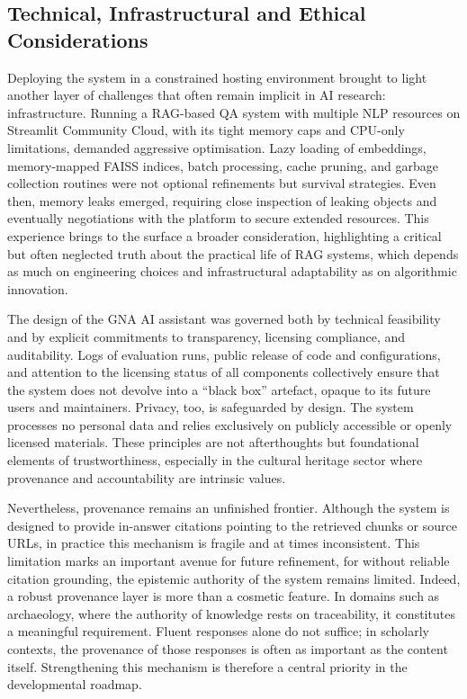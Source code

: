 \begin{spacing}{1.5}
\section{Technical, Infrastructural and Ethical Considerations}
Deploying the system in a constrained hosting environment brought to light another layer of challenges that often remain implicit in AI research: infrastructure. Running a RAG-based QA system with multiple NLP resources on Streamlit Community Cloud, with its tight memory caps and CPU-only limitations, demanded aggressive optimisation. Lazy loading of embeddings, memory-mapped FAISS indices, batch processing, cache pruning, and garbage collection routines were not optional refinements but survival strategies. Even then, memory leaks emerged, requiring close inspection of leaking objects and eventually negotiations with the platform to secure extended resources. This experience brings to the surface a broader consideration, highlighting a critical but often neglected truth about the practical life of RAG systems, which depends as much on engineering choices and infrastructural adaptability as on algorithmic innovation.

The design of the GNA AI assistant was governed both by technical feasibility and by explicit commitments to transparency, licensing compliance, and auditability. Logs of evaluation runs, public release of code and configurations, and attention to the licensing status of all components collectively ensure that the system does not devolve into a ``black box'' artefact, opaque to its future users and maintainers. Privacy, too, is safeguarded by design. The system processes no personal data and relies exclusively on publicly accessible or openly licensed materials. These principles are not afterthoughts but foundational elements of trustworthiness, especially in the cultural heritage sector where provenance and accountability are intrinsic values.

Nevertheless, provenance remains an unfinished frontier. Although the system is designed to provide in-answer citations pointing to the retrieved chunks or source URLs, in practice this mechanism is fragile and at times inconsistent. This limitation marks an important avenue for future refinement, for without reliable citation grounding, the epistemic authority of the system remains limited. Indeed, a robust provenance layer is more than a cosmetic feature. In domains such as archaeology, where the authority of knowledge rests on traceability, it constitutes a meaningful requirement. Fluent responses alone do not suffice; in scholarly contexts, the provenance of those responses is often as important as the content itself. Strengthening this mechanism is therefore a central priority in the developmental roadmap.


\end{spacing}
